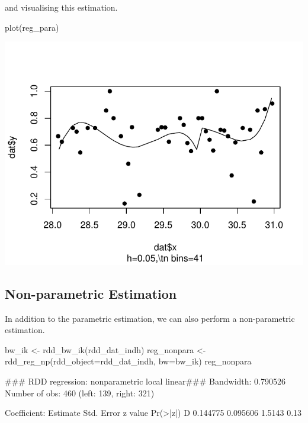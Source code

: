 \documentclass[article]{jss}
\begin{document}
and visualising this estimation.

\begin{CodeChunk}
\begin{CodeInput}
plot(reg_para)
\end{CodeInput}


\begin{center}\includegraphics{README_files/figure-latex/plot-reg_para-1} \end{center}

\end{CodeChunk}

\subsection{Non-parametric Estimation}\label{non-parametric-estimation}

In addition to the parametric estimation, we can also perform a
non-parametric estimation.

\begin{CodeChunk}
\begin{CodeInput}
bw_ik <- rdd_bw_ik(rdd_dat_indh)
reg_nonpara <- rdd_reg_np(rdd_object=rdd_dat_indh, bw=bw_ik)
reg_nonpara
\end{CodeInput}
\begin{CodeOutput}
### RDD regression: nonparametric local linear###
    Bandwidth:  0.790526 
    Number of obs: 460 (left: 139, right: 321)

    Coefficient:
  Estimate Std. Error z value Pr(>|z|)
D 0.144775   0.095606  1.5143     0.13
\end{CodeOutput}
\end{CodeChunk}
\end{document}
